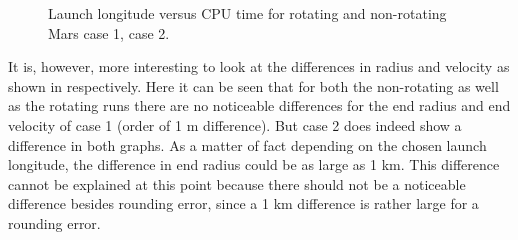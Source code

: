 \begin{figure}[H]
\centering
{} 
\caption{Launch longitude versus CPU time for rotating and non-rotating Mars \protect{} case 1,  \protect{} case 2. } 
\label{fig:launchLongitudeVsCPUcase1combined} 
\end{figure} 

\noindent
It is, however, more interesting to look at the differences in radius and velocity as shown in  respectively. Here it can be seen that for both the non-rotating as well as the rotating runs there are no noticeable differences for the end radius and end velocity of case 1 (order of 1 m difference). But case 2 does indeed show a difference in both graphs. As a matter of fact depending on the chosen launch longitude, the difference in end radius could be as large as 1 km. This difference cannot be explained at this point because there should not be a noticeable difference besides rounding error, since a 1 km difference is rather large for a rounding error.


